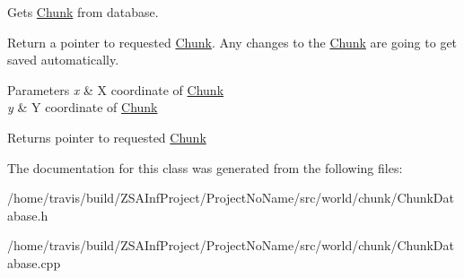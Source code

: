 Gets \hyperlink{classChunk}{Chunk} from database. 

Return a pointer to requested \hyperlink{classChunk}{Chunk}. Any changes to the \hyperlink{classChunk}{Chunk} are going to get saved automatically. 
\begin{DoxyParams}{Parameters}
{\em x} & X coordinate of \hyperlink{classChunk}{Chunk} \\
\hline
{\em y} & Y coordinate of \hyperlink{classChunk}{Chunk} \\
\hline
\end{DoxyParams}
\begin{DoxyReturn}{Returns}
pointer to requested \hyperlink{classChunk}{Chunk} 
\end{DoxyReturn}


The documentation for this class was generated from the following files\-:\begin{DoxyCompactItemize}
\item 
/home/travis/build/\-Z\-S\-A\-Inf\-Project/\-Project\-No\-Name/src/world/chunk/Chunk\-Database.\-h\item 
/home/travis/build/\-Z\-S\-A\-Inf\-Project/\-Project\-No\-Name/src/world/chunk/Chunk\-Database.\-cpp\end{DoxyCompactItemize}
